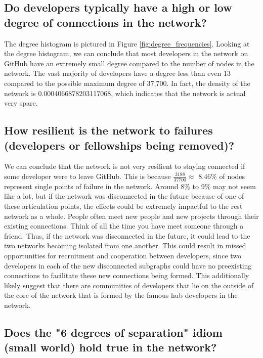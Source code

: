 \documentclass[9pt,twocolumn,twoside]{pnas-new}
\begin{document}
\subsection*{Do developers typically have a high or low degree of connections in the network?}

The degree histogram is pictured in Figure \ref{fig:degree_frequencies}. Looking at the degree histogram, we can conclude that most developers in the network on GitHub have an extremely small degree compared to the number of nodes in the network. The vast majority of developers have a degree less than even 13 compared to the possible maximum degree of 37,700. In fact, the density of the network is 0.0004066878203117068, which indicates that the network is actual very spare.

\subsection*{How resilient is the network to failures (developers or fellowships being removed)?}

We can conclude that the network is not very resilient to staying connected if some developer were to leave GitHub. This is because $\frac{3188}{37700} \approx$ 8.46\% of nodes represent single points of failure in the network. Around 8\% to 9\% may not seem like a lot, but if the network was disconnected in the future because of one of these articulation points, the effects could be extremely impactful to the rest network as a whole. People often meet new people and new projects through their existing connections. Think of all the time you have meet someone through a friend. Thus, if the network was disconnected in the future, it could lead to the two networks becoming isolated from one another. This could result in missed opportunities for recruitment and cooperation between developers, since two developers in each of the new disconnected subgraphs could have no preexisting connections to facilitate these new connections being formed. This additionally likely suggest that there are communities of developers that lie on the outside of the core of the network that is formed by the famous hub developers in the network.

\subsection*{Does the "6 degrees of separation" idiom (small world) hold true in the network?}
\end{document}
